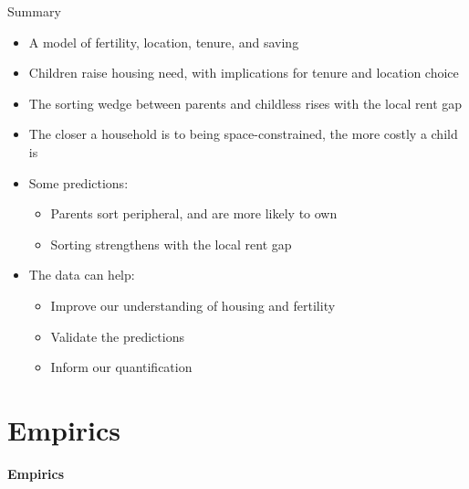 \documentclass[11pt,aspectratio=169]{beamer}
\begin{document}
\begin{frame}{Summary}
\small
\begin{itemize}\setlength\itemsep{0.5em}
  \item A model of fertility, location, tenure, and saving
  \item Children raise housing need, with implications for tenure and location choice
  \item The sorting wedge between parents and childless rises with the local rent gap
  \item The closer a household is to being space-constrained, the more costly a child is
  \item Some predictions:
    \begin{itemize}\setlength\itemsep{1pt}
      \item Parents sort peripheral, and are more likely to own
      \item Sorting strengthens with the local rent gap
    \end{itemize}
  \item The data can help:
    \begin{itemize}\setlength\itemsep{1pt}
      \item Improve our understanding of housing and fertility
      \item Validate the predictions
      \item Inform our quantification
    \end{itemize}
\end{itemize}
\end{frame}

\section{Empirics}

\begin{frame}
\centering
{\Large\textbf{Empirics}}
\end{frame}
\end{document}
